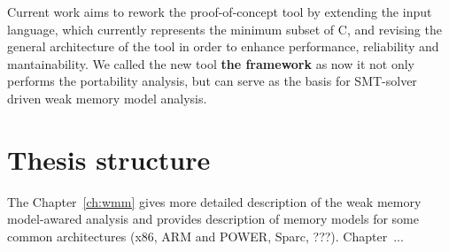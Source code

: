 Current work aims to rework the proof-of-concept tool  by extending the input language, which currently represents the minimum subset of C, and revising the general architecture of the tool in order to enhance performance, reliability and mantainability.
We called the new tool \textbf{the  framework} as now it not only performs the portability analysis, but can serve as the basis for SMT-solver driven weak memory model analysis.

\section{Thesis structure}
\label{ch:intro:structure}

The Chapter~\ref{ch:wmm} gives more detailed description of the weak memory model-awared analysis and provides description of memory models for some common architectures (x86, ARM and POWER, Sparc, ???). Chapter~...

